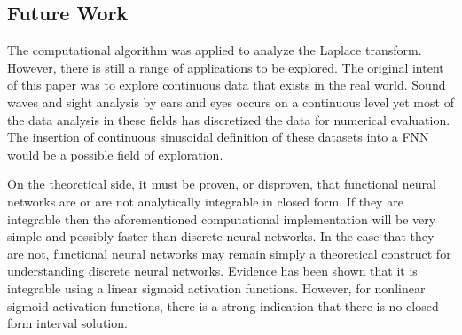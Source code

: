 \subsection{Future Work}
The computational algorithm was applied to analyze the Laplace transform. However, there is still a range of applications to be explored. The original intent of this paper was to explore continuous data that exists in the real world. Sound waves and sight analysis by ears and eyes occurs on a continuous level yet most of the data analysis in these fields has discretized the data for numerical evaluation. The insertion of continuous sinusoidal definition of these datasets into a FNN would be a possible field of exploration.

On the theoretical side, it must be proven, or disproven, that functional neural networks are or are not analytically integrable in closed form. If they are integrable then the aforementioned computational implementation will be very simple and possibly faster than discrete neural networks. In the case that they are not, functional neural networks may remain simply a theoretical construct for understanding discrete neural networks. Evidence has been shown that it is integrable using a linear sigmoid activation functions. However, for nonlinear sigmoid activation functions, there is a strong indication that there is no closed form interval solution.